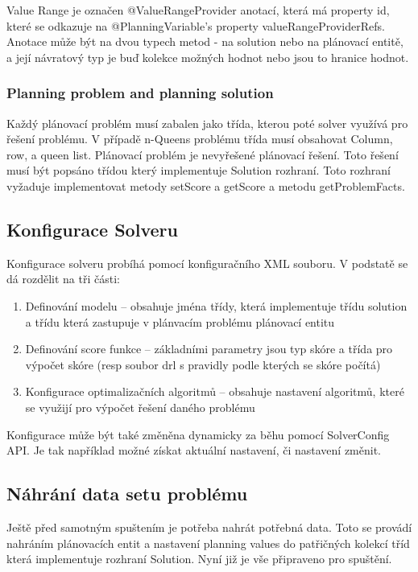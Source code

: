 Value Range je označen @ValueRangeProvider anotací, která má property id, které se odkazuje na  @PlanningVariable's property valueRangeProviderRefs. Anotace může být na dvou typech metod - na solution nebo na plánovací entitě, a její návratový typ je buď kolekce možných hodnot nebo jsou to hranice hodnot.  

\subsubsection{Planning problem and planning solution}
Každý plánovací problém musí zabalen jako třída, kterou poté solver využívá pro řešení problému. V případě n-Queens problému třída musí obsahovat Column, row, a queen list.
Plánovací problém je nevyřešené plánovací řešení. Toto řešení musí být popsáno třídou který implementuje Solution rozhraní. Toto rozhraní vyžaduje implementovat metody setScore a getScore a metodu getProblemFacts. 

\subsection{Konfigurace Solveru}
Konfigurace solveru probíhá pomocí konfiguračního XML souboru. V podstatě se dá rozdělit na tři části:
\begin{enumerate}
\item Definování modelu -- obsahuje jména třídy, která implementuje třídu solution a třídu která zastupuje v plánvacím problému plánovací entitu
\item Definování score funkce -- základními parametry jsou typ skóre a třída pro výpočet skóre (resp soubor drl s pravidly podle kterých se skóre počítá)
\item Konfigurace optimalizačních algoritmů -- obsahuje nastavení algoritmů, které se využijí pro výpočet řešení daného problému
\end{enumerate}
Konfigurace může být také změněna dynamicky za běhu pomocí SolverConfig API. Je tak například možné získat aktuální nastavení, či nastavení změnit.

\subsection{Náhrání data setu problému}
Ještě před samotným spuštením je potřeba nahrát potřebná data. Toto se provádí nahráním plánovacích entit a nastavení planning values do patřičných kolekcí tříd která implementuje rozhraní Solution. Nyní již je vše připraveno pro spuštění.

